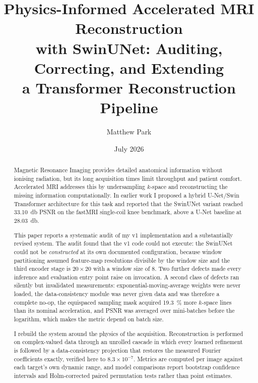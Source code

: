 \documentclass[11pt]{article}
\title{\bfseries Physics-Informed Accelerated MRI Reconstruction\\
with SwinUNet: Auditing, Correcting, and Extending\\
a Transformer Reconstruction Pipeline}
\author{Matthew Park}
\date{July 2026}
\begin{document}
\maketitle

\begin{abstract}
\noindent
Magnetic Resonance Imaging provides detailed anatomical information without
ionising radiation, but its long acquisition times limit throughput and patient
comfort. Accelerated MRI addresses this by undersampling $k$-space and
reconstructing the missing information computationally. In earlier work I
proposed a hybrid U-Net/Swin Transformer architecture for this task and reported
that the SwinUNet variant reached \SI{33.10}{\decibel} PSNR on the fastMRI
single-coil knee benchmark, above a U-Net baseline at
\SI{28.03}{\decibel}.

This paper reports a systematic audit of my v1 implementation and a
substantially revised system. The audit found that the v1 code could not
execute: the SwinUNet could not be \emph{constructed} at its own documented
configuration, because window partitioning assumed feature-map resolutions
divisible by the window size and the third encoder stage is $20\times20$ with a
window size of $8$. Two further defects made every inference and evaluation
entry point raise on invocation. A second class of defects ran silently but
invalidated measurements: exponential-moving-average weights were never loaded,
the data-consistency module was never given data and was therefore a complete
no-op, the equispaced sampling mask acquired \SI{19.3}{\percent} more
$k$-space lines than its nominal acceleration, and PSNR was averaged over
mini-batches before the logarithm, which makes the metric depend on batch size.

I rebuild the system around the physics of the acquisition. Reconstruction is
performed on complex-valued data through an unrolled cascade in which every
learned refinement is followed by a data-consistency projection that restores
the measured Fourier coefficients exactly, verified here to
$8.3\times10^{-7}$. Metrics are computed per image against each target's own
dynamic range, and model comparisons report bootstrap confidence intervals and
Holm-corrected paired permutation tests rather than point estimates.


\end{abstract}
\end{document}
